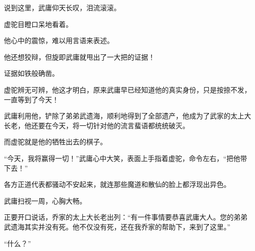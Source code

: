 \begin{this_body}
说到这里，武庸仰天长叹，泪流滚滚。

虚驼目瞪口呆地看着。

他心中的震惊，难以用言语来表述。

他还想狡辩，但旋即武庸就甩出了一大把的证据！

证据如铁般确凿。

虚驼辨无可辨，他这才明白，原来武庸早已经知道他的真实身份，只是按捺不发，一直等到了今天！

武庸利用他，铲除了弟弟武遗海，顺利地得到了全部遗产，他成为了武家的太上大长老，他还要在今天，将一切针对他的流言蜚语都统统破灭。

而虚驼就是他的牺牲出去的棋子。

“今天，我将赢得一切！”武庸心中大笑，表面上手指着虚驼，命令左右，“把他带下去！”

各方正道代表都骚动不安起来，就连那些魔道和散仙的脸上都浮现出异色。

武庸扫视一周，心胸大畅。

正要开口说话，乔家的太上大长老出列：“有一件事情要恭喜武庸大人。您的弟弟武遗海其实并没有死。他不仅没有死，还在我乔家的帮助下，来到了这里。”

“什么？”

\end{this_body}

